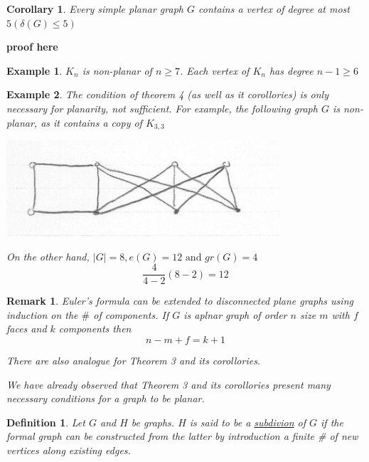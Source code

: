 \documentclass[12pt]{article}
\newtheorem*{corollary}{Corollary}
\newtheorem{example}{Example}
\newtheorem{definition}{Definition}
\newtheorem*{remark}{Remark}
\begin{document}
\begin{corollary}
Every simple planar graph $G$ contains a vertex of degree at most $5 (\delta(G) \le 5)$
\end{corollary}

\textbf{proof here}



\begin{example}
$K_{n}$ is non-planar of $n\ge 7$. Each vertex of $K_{n}$ has degree $n-1 \ge 6$
\end{example}

\begin{example}
  The condition of theorem 4 (as well as it corollories) is only necessary for planarity, not sufficient. For example, the following graph $G$ is non-planar, as it contains a copy of $K_{3,3}$

  \begin{center}
  \includegraphics[scale=0.5]{k3_non_planar}
  \end{center}

  On the other hand, $\vert G\vert =8, e(G) = 12 \text{ and } gr(G) = 4$
  \[\frac{4}{4-2} (8-2) = 12\]
\end{example}

\begin{remark}
  Euler's formula can be extended to disconnected plane graphs using induction on the $\#$ of components. If $G$ is aplnar graph of order $n$ size $m$ with $f$ faces and $k$ components then
  \[n- m + f = k +1\]

  There are also analogue for Theorem 3 and its corollories.

  We have already observed that Theorem 3 and its corollories present many necessary conditions for a graph to be planar.

\end{remark}


\begin{definition}
Let $G$ and $H$ be graphs. $H$ is said to be a \underline{subdivion} of $G$ if the formal graph can be constructed from the latter by introduction a finite \# of new vertices along existing edges.
\end{definition}
\end{document}
